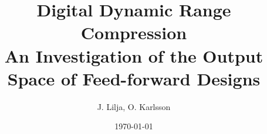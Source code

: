 \documentclass[]{article}
\begin{document}
\newcommand{\rootdir}{.}

\title{Digital Dynamic Range Compression \\ \Large An Investigation of the Output Space of Feed-forward Designs}
\author{J. Lilja, O. Karlsson}
\date{\today}
\maketitle

\begin{abstract}
\end{abstract}
\clearpage

\tableofcontents
\clearpage


\clearpage












\FloatBarrier
\clearpage


\end{document}
